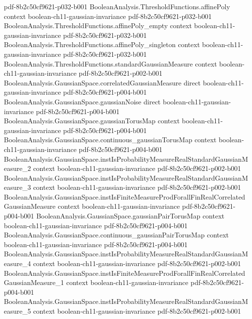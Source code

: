 \begin{theorem}
  {pdf-8b2c50cf9621-p032-b001}
\proofstep
  {BooleanAnalysis.ThresholdFunctions.affinePoly}
  {context}
  {boolean-ch11-gaussian-invariance}
  {pdf-8b2c50cf9621-p032-b001}
\proofstep
  {BooleanAnalysis.ThresholdFunctions.affinePoly_empty}
  {context}
  {boolean-ch11-gaussian-invariance}
  {pdf-8b2c50cf9621-p032-b001}
\proofstep
  {BooleanAnalysis.ThresholdFunctions.affinePoly_singleton}
  {context}
  {boolean-ch11-gaussian-invariance}
  {pdf-8b2c50cf9621-p032-b001}
\proofstep
  {BooleanAnalysis.ThresholdFunctions.standardGaussianMeasure}
  {context}
  {boolean-ch11-gaussian-invariance}
  {pdf-8b2c50cf9621-p002-b001}
\proofstep
  {BooleanAnalysis.GaussianSpace.correlatedGaussianMeasure}
  {direct}
  {boolean-ch11-gaussian-invariance}
  {pdf-8b2c50cf9621-p004-b001}
\proofstep
  {BooleanAnalysis.GaussianSpace.gaussianNoise}
  {direct}
  {boolean-ch11-gaussian-invariance}
  {pdf-8b2c50cf9621-p004-b001}
\proofstep
  {BooleanAnalysis.GaussianSpace.gaussianTorusMap}
  {context}
  {boolean-ch11-gaussian-invariance}
  {pdf-8b2c50cf9621-p004-b001}
\proofstep
  {BooleanAnalysis.GaussianSpace.continuous_gaussianTorusMap}
  {context}
  {boolean-ch11-gaussian-invariance}
  {pdf-8b2c50cf9621-p004-b001}
\proofstep
  {BooleanAnalysis.GaussianSpace.instIsProbabilityMeasureRealStandardGaussianMeasure_2}
  {context}
  {boolean-ch11-gaussian-invariance}
  {pdf-8b2c50cf9621-p002-b001}
\proofstep
  {BooleanAnalysis.GaussianSpace.instIsProbabilityMeasureRealStandardGaussianMeasure_3}
  {context}
  {boolean-ch11-gaussian-invariance}
  {pdf-8b2c50cf9621-p002-b001}
\proofstep
  {BooleanAnalysis.GaussianSpace.instIsFiniteMeasureProdForallFinRealCorrelatedGaussianMeasure}
  {context}
  {boolean-ch11-gaussian-invariance}
  {pdf-8b2c50cf9621-p004-b001}
\proofstep
  {BooleanAnalysis.GaussianSpace.gaussianPairTorusMap}
  {context}
  {boolean-ch11-gaussian-invariance}
  {pdf-8b2c50cf9621-p004-b001}
\proofstep
  {BooleanAnalysis.GaussianSpace.continuous_gaussianPairTorusMap}
  {context}
  {boolean-ch11-gaussian-invariance}
  {pdf-8b2c50cf9621-p004-b001}
\proofstep
  {BooleanAnalysis.GaussianSpace.instIsProbabilityMeasureRealStandardGaussianMeasure_4}
  {context}
  {boolean-ch11-gaussian-invariance}
  {pdf-8b2c50cf9621-p002-b001}
\proofstep
  {BooleanAnalysis.GaussianSpace.instIsFiniteMeasureProdForallFinRealCorrelatedGaussianMeasure_1}
  {context}
  {boolean-ch11-gaussian-invariance}
  {pdf-8b2c50cf9621-p004-b001}
\proofstep
  {BooleanAnalysis.GaussianSpace.instIsProbabilityMeasureRealStandardGaussianMeasure_5}
  {context}
  {boolean-ch11-gaussian-invariance}
  {pdf-8b2c50cf9621-p002-b001}

\end{theorem}
